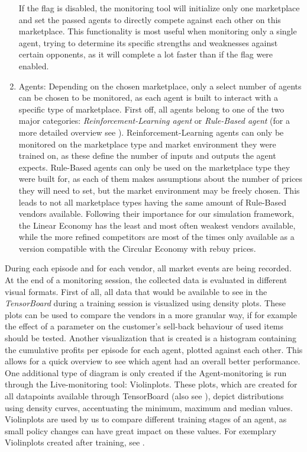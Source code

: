 \begin{enumerate}
	      If the flag is disabled, the monitoring tool will initialize only one marketplace and set the passed agents to directly compete against each other on this marketplace. This functionality is most useful when monitoring only a single agent, trying to determine its specific strengths and weaknesses against certain opponents, as it will complete a lot faster than if the flag were enabled.
	\item Agents: Depending on the chosen marketplace, only a select number of agents can be chosen to be monitored, as each agent is built to interact with a specific type of marketplace. First off, all agents belong to one of the two major categories: \emph{Reinforcement-Learning agent} or \emph{Rule-Based agent} (for a more detailed overview see ). Reinforcement-Learning agents can only be monitored on the marketplace type and market environment they were trained on, as these define the number of inputs and outputs the agent expects. Rule-Based agents can only be used on the marketplace type they were built for, as each of them makes assumptions about the number of prices they will need to set, but the market environment may be freely chosen. This leads to not all marketplace types having the same amount of Rule-Based vendors available. Following their importance for our simulation framework, the Linear Economy has the least and most often weakest vendors available, while the more refined competitors are most of the times only available as a version compatible with the Circular Economy with rebuy prices.
\end{enumerate}

During each episode and for each vendor, all market events are being recorded. At the end of a monitoring session, the collected data is evaluated in different visual formats. First of all, all data that would be available to see in the \emph{TensorBoard} during a training session is visualized using density plots. These plots can be used to compare the vendors in a more granular way, if for example the effect of a parameter on the customer's sell-back behaviour of used items should be tested. Another visualization that is created is a histogram containing the cumulative profits per episode for each agent, plotted against each other. This allows for a quick overview to see which agent had an overall better performance. One additional type of diagram is only created if the Agent-monitoring is run through the Live-monitoring tool: Violinplots. These plots, which are created for all datapoints available through TensorBoard (also see ), depict distributions using density curves, accentuating the minimum, maximum and median values. Violinplots are used by us to compare different training stages of an agent, as small policy changes can have great impact on these values. For exemplary Violinplots created after training, see .

